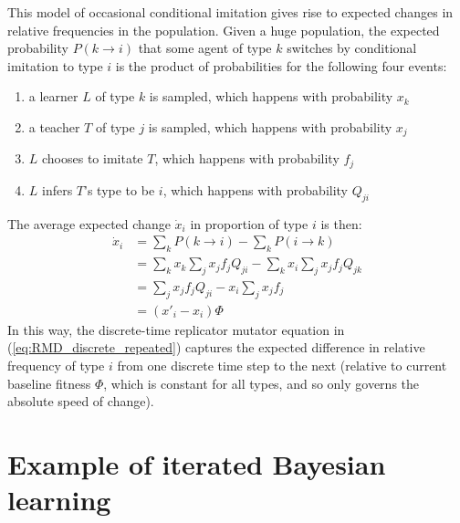\documentclass[a4paper, 11pt]{article}
\theoremstyle{Satz}
\begin{document}
This model of occasional conditional imitation gives rise to expected changes in relative
frequencies in the population. Given a huge population, the expected probability
$P(k \rightarrow i)$ that some agent of type $k$ switches by conditional imitation to type $i$
is the product of probabilities for the following four events:
\begin{enumerate}
\item a learner $L$ of type $k$ is sampled, which happens with probability $x_k$
\item a teacher $T$ of type $j$ is sampled, which happens with probability $x_j$
\item $L$ chooses to imitate $T$, which happens with probability $f_j$
\item $L$ infers $T$'s type to be $i$, which happens with probability $Q_{ji}$
\end{enumerate}
The average expected change $\dot{x}_i$ in proportion of type $i$ is then:
\begin{align*}
  \dot{x}_i & = \sum_k P(k \rightarrow i) - \sum_k P(i \rightarrow k) \\ 
  & = \sum_k x_k \sum_j x_j f_j Q_{ji} -   \sum_k x_i \sum_j x_j f_j Q_{jk} \\
  & = \sum_j x_j f_j Q_{ji} -   x_i \sum_j x_j f_j \\
  & =   (x'_i - x_i) \Phi
\end{align*}
In this way, the discrete-time replicator mutator equation in (\ref{eq:RMD_discrete_repeated})
captures the expected difference in relative frequency of type $i$ from one discrete time step
to the next (relative to current baseline fitness $\Phi$, which is constant for all types, and
so only governs the absolute speed of change).

\section{Example of iterated Bayesian learning}
\label{sec:example-iter-bayes}
\end{document}
